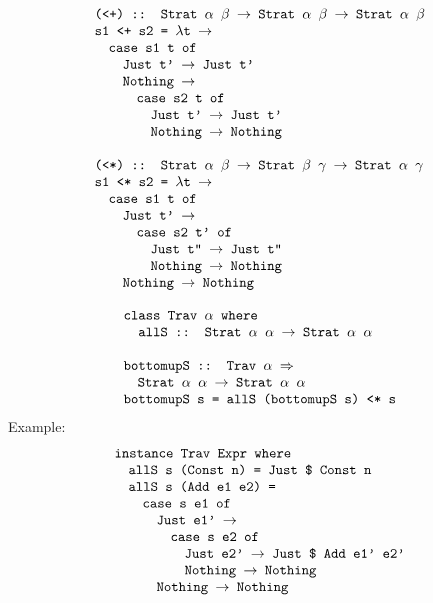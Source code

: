 \documentclass[leqno, fleqn]{foils}
\newcommand{\ve}[1]{\ensuremath{\text{\tt #1}}}
\newcommand{\ra}{\ensuremath{\rightarrow} }
\newcommand{\Ra}{\ensuremath{\Rightarrow} }
\begin{document}

\[
\begin{array}{l}
\ve{(<+) :: Strat $\alpha$ $\beta$ \ra Strat $\alpha$ $\beta$ \ra Strat $\alpha$ $\beta$} \\
\ve{s1 <+ s2 = $\lambda$t \ra} \\
\quad \ve{case s1 t of} \\
\quad \quad \ve{Just t' \ra Just t'} \\
\quad \quad \ve{Nothing \ra} \\
\quad \quad \quad \ve{case s2 t of} \\
\quad \quad \quad \quad \ve{Just t' \ra Just t'} \\
\quad \quad \quad \quad \ve{Nothing \ra Nothing} \\
\\
\ve{(<*) :: Strat $\alpha$ $\beta$ \ra Strat $\beta$ $\gamma$ \ra Strat $\alpha$ $\gamma$} \\
\ve{s1 <* s2 = $\lambda$t \ra} \\
\quad \ve{case s1 t of} \\
\quad \quad \ve{Just t' \ra} \\
\quad \quad \quad \ve{case s2 t' of} \\
\quad \quad \quad \quad \ve{Just t'' \ra Just t''} \\
\quad \quad \quad \quad \ve{Nothing \ra Nothing} \\
\quad \quad \ve{Nothing \ra Nothing} \\
\end{array}
\]




\[
\begin{array}{l}
\ve{class Trav $\alpha$ where} \\
\ve{\quad allS :: Strat $\alpha$ $\alpha$ \ra Strat $\alpha$ $\alpha$}
\\
\\
\ve{bottomupS :: Trav $\alpha$ \Ra} \\
\quad \ve{Strat $\alpha$ $\alpha$ \ra Strat $\alpha$ $\alpha$} \\
\ve{bottomupS s = allS (bottomupS s) <* s}
\end{array}
\]
Example:
\[
\begin{array}{l}
\ve{instance Trav Expr where} \\
\quad \ve{allS s (Const n) = Just \$ Const n} \\
\quad \ve{allS s (Add e1 e2) =} \\
\quad \quad \ve{case s e1 of} \\
\quad \quad \quad \ve{Just e1' \ra} \\
\quad \quad \quad \quad \ve{case s e2 of} \\
\quad \quad \quad \quad \quad \ve{Just e2' \ra Just \$ Add e1' e2'} \\
\quad \quad \quad \quad \quad \ve{Nothing \ra Nothing} \\
\quad \quad \quad \ve{Nothing \ra Nothing} 
\end{array}
\]
\end{document}

